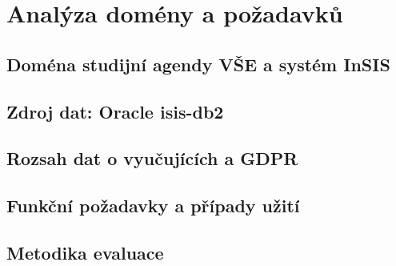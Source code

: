 \chapter{Analýza domény a požadavků}
\label{ch:analyza}

\section{Doména studijní agendy VŠE a systém InSIS}

\section{Zdroj dat: Oracle isis-db2}

\section{Rozsah dat o vyučujících a GDPR}

\section{Funkční požadavky a případy užití}

\section{Metodika evaluace}
